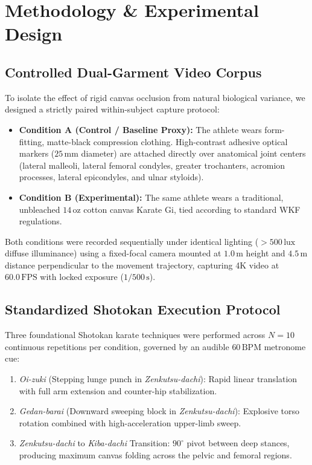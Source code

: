 \section{Methodology \& Experimental Design}
\label{sec:methodology}

\subsection{Controlled Dual-Garment Video Corpus}
To isolate the effect of rigid canvas occlusion from natural biological variance, we designed a strictly paired within-subject capture protocol:
\begin{itemize}
    \item \textbf{Condition A (Control / Baseline Proxy):} The athlete wears form-fitting, matte-black compression clothing. High-contrast adhesive optical markers ($25\,\text{mm}$ diameter) are attached directly over anatomical joint centers (lateral malleoli, lateral femoral condyles, greater trochanters, acromion processes, lateral epicondyles, and ulnar styloids).
    \item \textbf{Condition B (Experimental):} The same athlete wears a traditional, unbleached $14\,\text{oz}$ cotton canvas Karate Gi, tied according to standard WKF regulations.
\end{itemize}

Both conditions were recorded sequentially under identical lighting ($>500\,\text{lux}$ diffuse illuminance) using a fixed-focal camera mounted at $1.0\,\text{m}$ height and $4.5\,\text{m}$ distance perpendicular to the movement trajectory, capturing 4K video at $60.0\,\text{FPS}$ with locked exposure ($1/500\,\text{s}$).

\subsection{Standardized Shotokan Execution Protocol}
Three foundational Shotokan karate techniques were performed across $N=10$ continuous repetitions per condition, governed by an audible $60\,\text{BPM}$ metronome cue:
\begin{enumerate}
    \item \textit{Oi-zuki} (Stepping lunge punch in \textit{Zenkutsu-dachi}): Rapid linear translation with full arm extension and counter-hip stabilization.
    \item \textit{Gedan-barai} (Downward sweeping block in \textit{Zenkutsu-dachi}): Explosive torso rotation combined with high-acceleration upper-limb sweep.
    \item \textit{Zenkutsu-dachi} to \textit{Kiba-dachi} Transition: $90^\circ$ pivot between deep stances, producing maximum canvas folding across the pelvic and femoral regions.
\end{enumerate}

